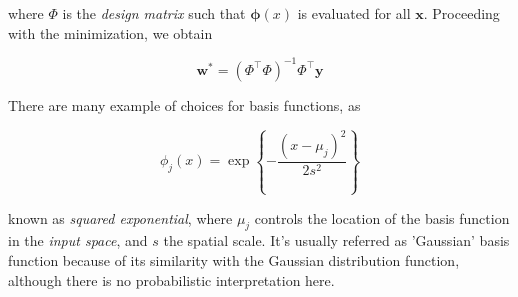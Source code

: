 \documentclass[11pt]{article} %
\begin{document}
where $\Phi$ is the \textit{design matrix} such that $\boldsymbol{\phi}(x)$ is evaluated for all $\mathbf{x}$. Proceeding with the minimization, we obtain

\begin{equation}
   \mathbf{w}^{*} = (\Phi^\top \Phi)^{-1}\Phi^\top \mathbf{y}
\end{equation}

There are many example of choices for basis functions, as

\begin{equation}
   \phi_j(x) = \exp \left\{ -\frac{\left(x-\mu_j\right)^2}{2s^2} \right\}
\end{equation}

known as \textit{squared exponential}, where $\mu_j$ controls the location of the basis function in the \textit{input space}, and $s$ the spatial scale. It's usually referred as 'Gaussian' basis function because of its similarity with the Gaussian distribution function, although there is no probabilistic interpretation here.


\lipsum[1]


\newpage

\end{document}
